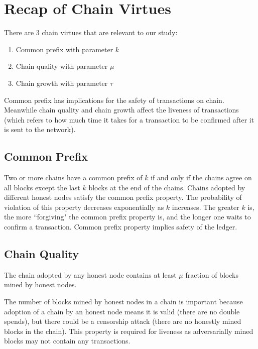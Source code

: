 \section{Recap of Chain Virtues}
There are 3 chain virtues that are relevant to our study:

\begin{enumerate}
    \item Common prefix with parameter $k$
    \item Chain quality with parameter $\mu$
    \item Chain growth with parameter $\tau$
\end{enumerate}


Common prefix has implications for the safety of transactions on chain. Meanwhile chain quality and chain growth affect the liveness of transactions (which refers to how much time it takes for a transaction to be confirmed after it is sent to the network).

\subsection{Common Prefix}

Two or more chains have a common prefix of $k$ if and only if the chains agree on all blocks except the last $k$ blocks at the end of the chains.
Chains adopted by different honest nodes satisfy the common prefix property.
The probability of violation of this property decreases exponentially as $k$ increases. The greater $k$ is, the more ``forgiving" the common prefix property is, and the longer one waits to confirm a transaction.
Common prefix property implies safety of the ledger.

\subsection{Chain Quality}
The chain adopted by any honest node contains at least $\mu$ fraction of blocks mined by honest nodes.

The number of blocks mined by honest nodes in a chain is important because adoption of a chain by an honest node means it is valid (there are no double spends), but there could be a censorship attack (there are no honestly mined blocks in the chain).
This property is required for liveness as adversarially mined blocks may not contain any transactions.


